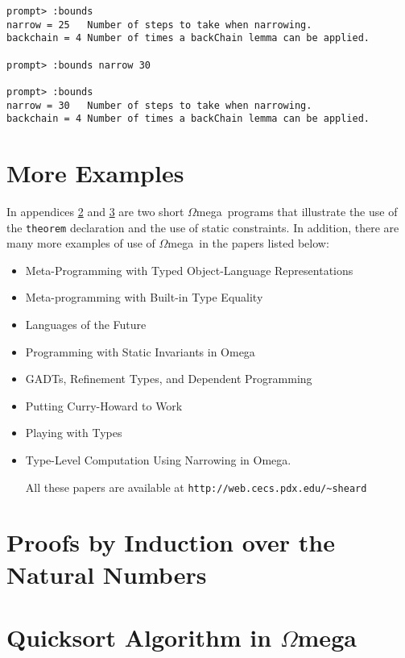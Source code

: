 \documentclass[11pt,twoside]{article}
\newcommand{\om}{$\Omega$mega}
\begin{document}
\begin{verbatim}
prompt> :bounds
narrow = 25   Number of steps to take when narrowing.
backchain = 4 Number of times a backChain lemma can be applied.

prompt> :bounds narrow 30

prompt> :bounds
narrow = 30   Number of steps to take when narrowing.
backchain = 4 Number of times a backChain lemma can be applied.
\end{verbatim}

\section{More Examples}\label{examples}

In appendices \ref{induction} and \ref{quick} are two
short \om\ programs that illustrate the use of the {\tt theorem}
declaration and the use of static constraints. In addition,
there are many more examples of use of \om\ in the papers listed below:
\begin{itemize}

\item Meta-Programming with Typed Object-Language Representations\cite{PasalicLingerGpce}
\item Meta-programming with Built-in Type Equality\cite{SheardLogFrWks04}
\item Languages of the Future\cite{Sheard:2004:LF}
\item Programming with Static Invariants in Omega\cite{SheardLinger}
\item GADTs, Refinement Types, and Dependent Programming\cite{SheardHookLinger}
\item Putting Curry-Howard to Work\cite{CurryHoward}
\item Playing with Types\cite{Playing}
\item Type-Level Computation Using Narrowing in Omega.

All these papers are available at \verb+http://web.cecs.pdx.edu/~sheard+

\end{itemize}
 
\nocite{*}



\appendix

\section{Proofs by Induction over the Natural Numbers} \label{induction}



\section{Quicksort Algorithm in \om}\label{quick}



\printindex
\end{document}
